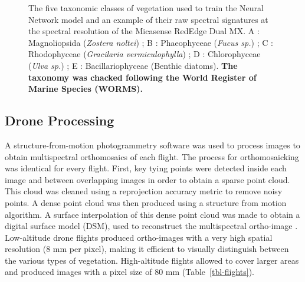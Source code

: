 \documentclass[
  number]{elsarticle}
\begin{document}
\label{cell-fig-vegetation}
\begin{figure}[H]


\caption{\label{fig-vegetation}The five taxonomic classes of vegetation
used to train the Neural Network model and an example of their raw
spectral signatures at the spectral resolution of the Micasense RedEdge
Dual MX. A : Magnoliopsida (\emph{Zostera noltei}) ; B : Phaeophyceae
(\emph{Fucus sp.}) ; C : Rhodophyceae (\emph{Gracilaria
vermiculophylla}) ; D : Chlorophyceae (\emph{Ulva sp.}) ; E :
Bacillariophyceae (Benthic diatoms). \textbf{The taxonomy was chacked
following the World Register of Marine Species (WORMS).}}

\end{figure}%

\subsection{Drone Processing}\label{drone-processing}

A structure-from-motion photogrammetry software \citep[Agisoft
Metashape,][]{agisoft} was used to process images to obtain
multispectral orthomosaics of each flight. The process for
orthomosaicking was identical for every flight. First, key tying points
were detected inside each image and between overlapping images in order
to obtain a sparse point cloud. This cloud was cleaned using a
reprojection accuracy metric to remove noisy points. A dense point cloud
was then produced using a structure from motion algorithm. A surface
interpolation of this dense point cloud was made to obtain a digital
surface model (DSM), used to reconstruct the multispectral ortho-image
\citep{nebel2020review}. Low-altitude drone flights produced
ortho-images with a very high spatial resolution (8 mm per pixel),
making it efficient to visually distinguish between the various types of
vegetation. High-altitude flights allowed to cover larger areas and
produced images with a pixel size of 80 mm (Table~\ref{tbl-flights}).
\end{document}
